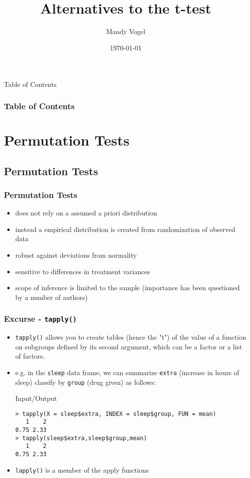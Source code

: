 \documentclass[xcolor={table},handout]{beamer}
\begin{document}
\title{Alternatives to the t-test}   
\author{Mandy Vogel} 
\date{\today}


\begin{frame}
\titlepage
\end{frame}

\begin{frame}{Table of Contents}
\frametitle{Table of Contents}\tableofcontents
\end{frame}

\section{Permutation Tests}
\subsection{Permutation Tests}
\begin{frame}\frametitle{Permutation Tests}
\begin{itemize}
\item does not rely on a assumed a priori distribution
\item instead a empirical distribution is created from randomization of observed data
\item robust against deviations from normality
\item sensitive to differences in treatment variances
\item scope of inference is limited to the sample (importance has been questioned by a number of authors)
\end{itemize}
\end{frame}

\begin{frame}[fragile]\frametitle{Excurse - \texttt{tapply()}}
\begin{itemize}
\item \texttt{tapply()} allows you to create tables (hence the "t") of the value of a function on subgroups defined by its second argument, which can be a factor or a list of factors.
\item e.g. in the \texttt{sleep} data frame, we can  summarize \texttt{extra} (increase in hours of sleep) classify by \texttt{group} (drug given) as follows:
\begin{exampleblock}{Input/Output}\small
\begin{verbatim}
> tapply(X = sleep$extra, INDEX = sleep$group, FUN = mean)
   1    2 
0.75 2.33 
> tapply(sleep$extra,sleep$group,mean)
   1    2 
0.75 2.33 
\end{verbatim}
\end{exampleblock}
\item \texttt{lapply()} is a member of the apply functions 
\end{itemize}
\end{frame}
\end{document}
